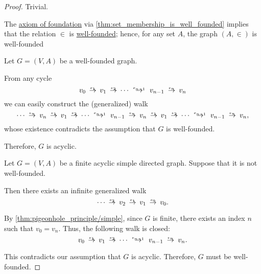 \begin{proof}
   Trivial.

   The \hyperref[def:zfc/foundation]{axiom of foundation} via \cref{thm:set_membership_is_well_founded} implies that the relation \( {\in} \) is \hyperref[def:well_founded_relation]{well-founded}; hence, for any set \( A \), the graph \( (A, {\in}) \) is well-founded

   Let \( G = (V, A) \) be a well-founded graph.

  From any cycle
  \begin{equation*}
    v_0 \reloset {e_1} \to v_1 \reloset {e_2} \to \cdots \reloset {e_{n-1}} \to v_{n-1} \reloset {e_n} \to v_n
  \end{equation*}
  we can easily construct the (generalized) walk
  \begin{equation*}
    \cdots \reloset {e_n} \to v_n \reloset {e_1} \to v_1 \reloset {e_2} \to \cdots \reloset {e_{n-1}} \to v_{n-1} \reloset {e_n} \to v_n \reloset {e_1} \to v_1 \reloset {e_2} \to \cdots \reloset {e_{n-1}} \to v_{n-1} \reloset {e_n} \to v_n,
  \end{equation*}
  whose existence contradicts the assumption that \( G \) is well-founded.

  Therefore, \( G \) is acyclic.

   Let \( G = (V, A) \) be a finite acyclic simple directed graph. Suppose that it is not well-founded.

  Then there exists an infinite generalized walk
  \begin{equation*}
    \cdots \reloset {e_2} \to v_2 \reloset {e_1} \to v_1 \reloset {e_0} \to v_0.
  \end{equation*}

  By \cref{thm:pigeonhole_principle/simple}, since \( G \) is finite, there exists an index \( n \) such that \( v_0 = v_n \). Thus, the following walk is closed:
  \begin{equation*}
    v_0 \reloset {e_1} \to v_1 \reloset {e_2} \to \cdots \reloset {e_{n-1}} \to v_{n-1} \reloset {e_n} \to v_n.
  \end{equation*}

  This contradicts our assumption that \( G \) is acyclic. Therefore, \( G \) must be well-founded.
\end{proof}

